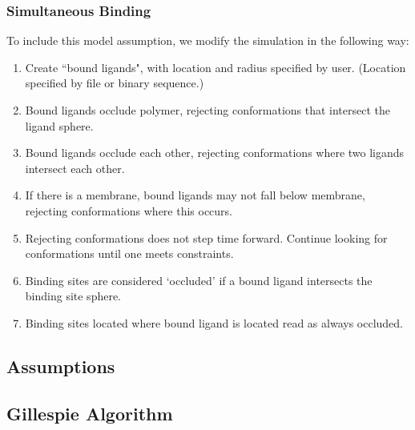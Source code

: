 \documentclass[../AdvancementSummary.tex]{subfiles}
\begin{document}



\subsubsection{Simultaneous Binding}

To include this model assumption, we modify the simulation in the following way:

\begin{enumerate}
\item Create ``bound ligands", with location and radius specified by user. (Location specified by file or binary sequence.)
\item Bound ligands occlude polymer, rejecting conformations that intersect the ligand sphere.
\item Bound ligands occlude each other, rejecting conformations where two ligands intersect each other.
\item If there is a membrane, bound ligands may not fall below membrane, rejecting conformations where this occurs.
\item Rejecting conformations does not step time forward.  Continue looking for conformations until one meets constraints.
\item Binding sites are considered `occluded' if a bound ligand intersects the binding site sphere.
\item Binding sites located where bound ligand is located read as always occluded.
\end{enumerate}



\subsection{Assumptions}
%

\subsection{Gillespie Algorithm}
\end{document}

